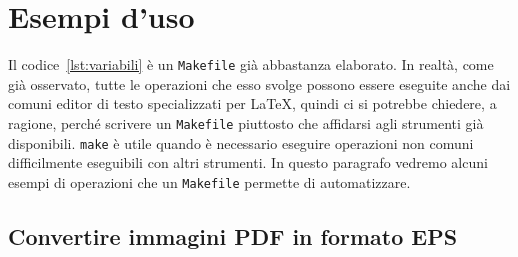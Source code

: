 \section{Esempi d'uso}
\label{sec:esempi}

Il codice~\ref{lst:variabili} è un \texttt{Makefile} già abbastanza elaborato.
In realtà, come già osservato, tutte le operazioni che esso svolge possono
essere eseguite anche dai comuni editor di testo specializzati per \LaTeX{},
quindi ci si potrebbe chiedere, a ragione, perché scrivere un \texttt{Makefile}
piuttosto che affidarsi agli strumenti già disponibili.  \texttt{make} è utile
quando è necessario eseguire operazioni non comuni difficilmente eseguibili con
altri strumenti.  In questo paragrafo vedremo alcuni esempi di operazioni che un
\texttt{Makefile} permette di automatizzare.

\subsection{Convertire immagini \textsc{PDF} in formato \textsc{EPS}}
\label{sec:immagini-eps}

